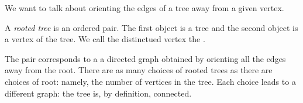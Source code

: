 
\sbasic







\sstart
{}


We want to talk about
orienting the edges of
a tree away from a given
vertex.


A \emph{rooted tree}
is an ordered pair. The first
object is a tree and the second
object is a vertex of the tree.
We call the
distinctued vertex the .

The pair corresponds to a
a directed graph obtained by
orienting all the edges away
from the root.
There are as many choices of
rooted trees as there are choices
of root: namely, the number of
vertices in the tree.
Each choice leads to a different
graph: the tree is, by definition,
connected.
\strats

